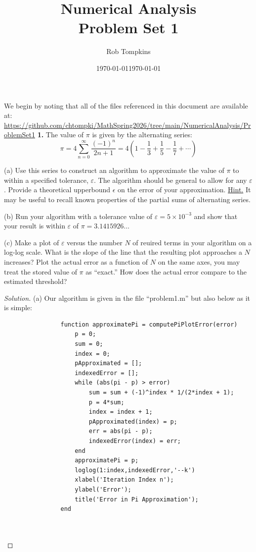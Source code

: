 \documentclass[12pt]{amsart}
\title{Numerical Analysis\\Problem Set 1}
\author{Rob Tompkins}
\date{\today}
\newenvironment{solution}
{\begin{proof}[Solution]}
{\end{proof}}
\begin{document}
    \maketitle
    \date{\today}
    \begin{onehalfspace}
        We begin by noting that all of the files referenced in this document are available at: \\
        \underline{https://github.com/chtompki/MathSpring2026/tree/main/NumericalAnalysis/ProblemSet1}
        \textbf{1.} The value of $\pi$ is given by the alternating series:
        \begin{displaymath}
            \pi = 4 \sum_{n=0}^{\infty} \frac{(-1)^n}{2n+1}
            = 4 \left(1 - \frac{1}{3} + \frac{1}{5} - \frac{1}{7}+ \cdots\right)
        \end{displaymath}

        (a) Use this series to construct an algorithm to approximate the value of $\pi$ to within a specified
        tolerance, $\varepsilon$. The algorithm should be general to allow for any $\varepsilon$. Provide a theoretical
        upperbound $\epsilon$ on the error of your approximation. \underline{Hint.} It may be useful to recall known
        properties of the partial sums of alternating series.

        (b) Run your algorithm with a tolerance value of $\varepsilon = 5\times 10^{-3}$ and show that your result is
        within $\varepsilon$ of $\pi = 3.1415926\ldots$

        (c) Make a plot of $\varepsilon$ versus the number $N$ of reuired terms in your algorithm on a log-log scale.
        What is the slope of the line that the resulting plot approaches a $N$ increases? Plot the actual error as a
        function of $N$ on the same axes, you may treat the stored value of $\pi$ as ``exact.'' How does the actual
        error compare to the estimated threshold?
        \begin{solution}
            (a) Our algorithm is given in the file ``problem1.m'' but also below as it is simple:
            \begin{verbatim}
                function approximatePi = computePiPlotError(error)
                    p = 0;
                    sum = 0;
                    index = 0;
                    pApproximated = [];
                    indexedError = [];
                    while (abs(pi - p) > error)
                        sum = sum + (-1)^index * 1/(2*index + 1);
                        p = 4*sum;
                        index = index + 1;
                        pApproximated(index) = p;
                        err = abs(pi - p);
                        indexedError(index) = err;
                    end
                    approximatePi = p;
                    loglog(1:index,indexedError,'--k')
                    xlabel('Iteration Index n');
                    ylabel('Error');
                    title('Error in Pi Approximation');
                end



\end{verbatim}
\end{solution}
\end{onehalfspace}
\end{document}
